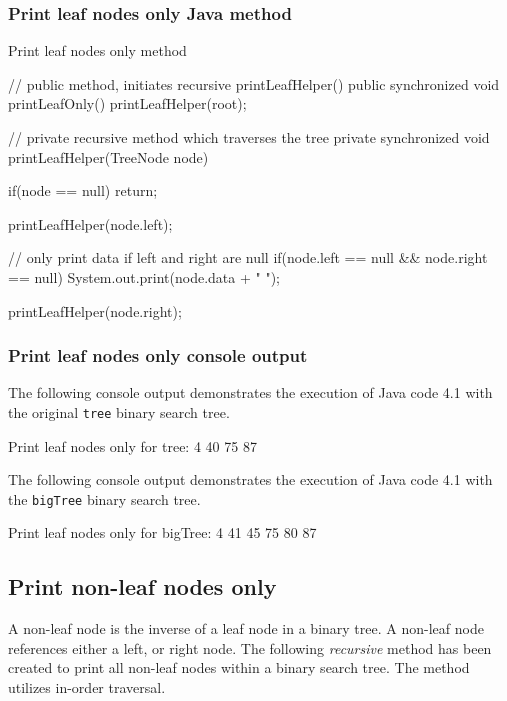 \subsubsection{Print leaf nodes only Java method}

\begin{listing}[H]
\caption{Print leaf nodes only method}
\begin{javacode}
// public method, initiates recursive printLeafHelper()
public synchronized void printLeafOnly() {
    printLeafHelper(root);
}

// private recursive method which traverses the tree
private synchronized void printLeafHelper(TreeNode node) {
    if(node == null) {
        return;
    }

    printLeafHelper(node.left);

    // only print data if left and right are null
    if(node.left == null && node.right == null) {
        System.out.print(node.data + " ");
    }

    printLeafHelper(node.right);
}
\end{javacode}
\end{listing}

\subsubsection{Print leaf nodes only console output}

The following console output demonstrates the execution of Java code 4.1 with the original \texttt{tree} binary search tree.
\\
\begin{consolecode}
Print leaf nodes only for tree:
4 40 75 87 
\end{consolecode}

\noindent
The following console output demonstrates the execution of Java code 4.1 with the \texttt{bigTree} binary search tree.
\\
\begin{consolecode}
Print leaf nodes only for bigTree:
4 41 45 75 80 87 
\end{consolecode}

\newpage
\subsection{Print non-leaf nodes only}

A non-leaf node is the inverse of a leaf node in a binary tree. A non-leaf node references either a left, or right node. The following \emph{recursive} method has been created to print all non-leaf nodes within a binary search tree. The method utilizes in-order traversal.

